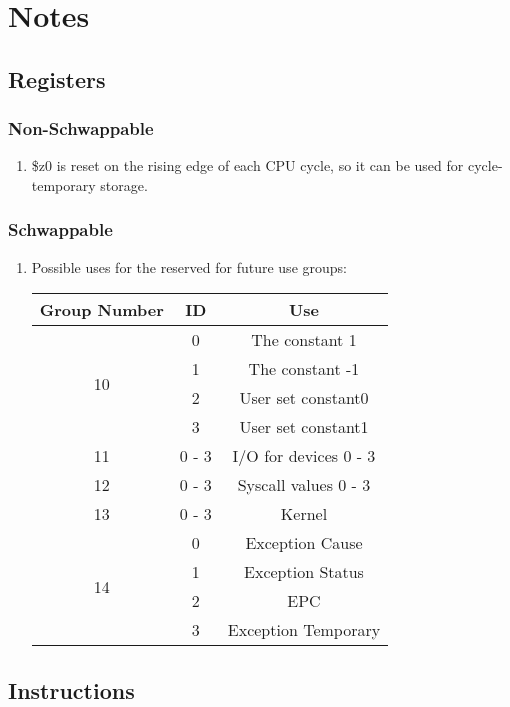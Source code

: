 \documentclass{article}
\begin{document}
\section{Notes}
	\subsection{Registers}
		\subsubsection{Non-Schwappable}
			\begin{enumerate}
				\item \$z0 is reset on the rising edge of each CPU cycle, so it can be used for cycle-temporary storage. 
			\end{enumerate}
		\subsubsection{Schwappable}
			\begin{enumerate}
				\item Possible uses for the reserved for future use groups:
					\begin{center} \begin{tabular}{| c | c | c |} \hline
						Group Number & ID    & Use \\ \hline
						\multirow{4}{*}{10}  & 0 & The constant 1 \\
						             & 1     & The constant -1 \\
						             & 2     & User set constant0 \\
						             & 3     & User set constant1 \\ \hline
						11           & 0 - 3 & I/O for devices 0 - 3 \\ \hline
						12           & 0 - 3 & Syscall values 0 - 3 \\ \hline
						13           & 0 - 3 & Kernel \\ \hline
						\multirow{4}{*}{14}  & 0 & Exception Cause \\
						             & 1     & Exception Status \\
						             & 2     & EPC \\
						             & 3     & Exception Temporary \\ \hline
					\end{tabular} \end{center} 
			\end{enumerate}
	\subsection{Instructions}
\end{document}
